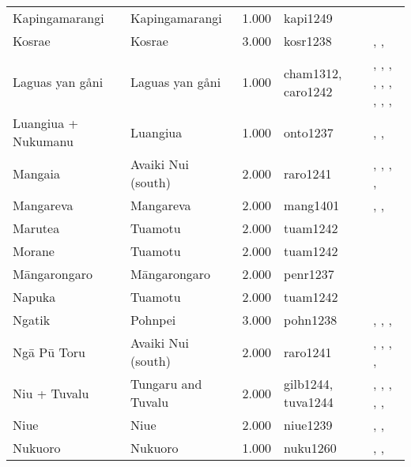 \begin{longtable}{p{1.8cm}p{1.8cm}p{1.8cm}p{2cm}p{7cm}}
  Kapingamarangi & Kapingamarangi & 1.000 & kapi1249 & \citet{buck1950} \\ 
  Kosrae & Kosrae & 3.000 & kosr1238 & \citet{athens2007prehistoric}, \citet{graves1986late}, \citet{peoples1991} \\ 
  Laguas yan gåni & Laguas yan gåni & 1.000 & cham1312, caro1242 & \citet{cordy1983social}, \citet{cordy1983social}, \citet{cordy1983social}, \citet{thompson_1971}, \citet{thompson_1971}, \citet{thompson_1971}, \citet{josephandmurray1951}, \citet{josephandmurray1951}, \citet{spehr1954}, \citet{spehr1954} \\ 
  Luangiua + Nukumanu & Luangiua & 1.000 & onto1237 & \citet{sahlins1958social}, \citet{bayliss1974constraints}, \citet{donner1991} \\ 
  Mangaia & Avaiki Nui (south) & 2.000 & raro1241 & \citet{bellwood1971varieties}, \citet{buck1934}, \citet{crocombe_1967}, \citet{hayes1981cook}, \citet{walter1996} \\ 
  Mangareva & Mangareva & 2.000 & mang1401 & \citet{buck1938}, \citet{conte2004archaeological}, \citet{green2000mangarevan} \\ 
  Marutea & Tuamotu & 2.000 & tuam1242 & \citet{emory1975material} \\ 
  Morane & Tuamotu & 2.000 & tuam1242 & \citet{emory1975material} \\ 
  Māngarongaro & Māngarongaro & 2.000 & penr1237 & \citet{buck1932b} \\ 
  Napuka & Tuamotu & 2.000 & tuam1242 & \citet{emory1975material} \\ 
  Ngatik & Pohnpei & 3.000 & pohn1238 & \citet{hanlon2019upon}, \citet{haun1984prehistoric}, \citet{raynor1991indigenous}, \citet{riesenberg1968native} \\ 
  Ngā Pū Toru & Avaiki Nui (south) & 2.000 & raro1241 & \citet{bellwood1971varieties}, \citet{buck1934}, \citet{crocombe_1967}, \citet{hayes1981cook}, \citet{walter1996} \\ 
  Niu + Tuvalu & Tungaru and Tuvalu & 2.000 & gilb1244, tuva1244 & \citet{lambert1966}, \citet{lambert1975makin}, \citet{lambert1991}, \citet{macdonald1982cinderellas}, \citet{macdonald1982cinderellas}, \citet{goldsmith1991} \\ 
  Niue & Niue & 2.000 & niue1239 & \citet{loeb1978}, \citet{smith1983niue}, \citet{walter_anderson1995} \\ 
  Nukuoro & Nukuoro & 1.000 & nuku1260 & \citet{carroll1966nukuoro}, \citet{carroll1975pacific}, \citet{eilers_1934} \\ 

\end{longtable}
